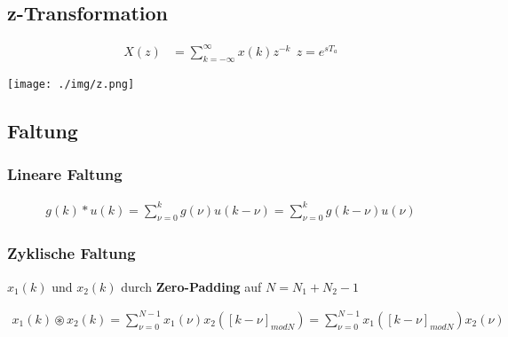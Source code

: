 \documentclass[10pt,a4paper]{article}
\begin{document}
  \subsection{z-Transformation}
  \begin{mdframed}[style=exercise]
    \begin{align}
        X(z) &=\sum_{k=-\infty}^{\infty} x(k)z^{-k} \ \ z=e^{s T_a}
    \end{align}
  \end{mdframed}
  \begin{center}
      \texttt{[image: ./img/z.png]}
  \end{center}
  \subsection{Faltung}
  \subsubsection{Lineare Faltung}
  \begin{mdframed}[style=exercise]
    \begin{align}
        g(k)*u(k) = \sum_{\nu =0}^{k} g(\nu) u(k-\nu)= \sum_{\nu =0}^{k} g(k-\nu) u(\nu)
    \end{align}
  \end{mdframed}
  \subsubsection{Zyklische Faltung}
  $x_1(k)$ und $x_2(k)$ durch \textbf{Zero-Padding} auf $N = N_1 +N_2 -1$ 
\scriptsize
  \begin{mdframed}[style=exercise]
    \begin{align}
        x_1(k) \circledast x_2(k) = \sum_{\nu =0}^{N-1} x_1(\nu) x_2([k-\nu]_{modN})= \sum_{\nu =0}^{N-1}x_1([k-\nu]_{modN}) x_2(\nu)
    \end{align}
  \end{mdframed}
\normalsize
\end{document}
